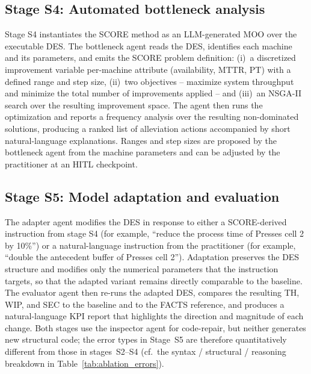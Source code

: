 \documentclass[a4paper,fleqn]{cas-sc}
\begin{document}
  \subsection{Stage S4: Automated bottleneck analysis}\label{sec:framework-s4}                                          
   
  Stage S4 instantiates the SCORE method \citep{Bernedixen2015} as an LLM-generated MOO over the executable DES. The    
  bottleneck agent reads the DES, identifies each machine and its parameters, and emits the SCORE problem definition:
  (i)~a discretized improvement variable per-machine attribute (availability, MTTR, PT) with a defined range and    
  step size, (ii)~two objectives -- maximize system throughput and minimize the total number of improvements applied --
  and (iii)~an NSGA-II search over the resulting improvement space. The agent then runs the optimization and reports a
  frequency analysis over the resulting non-dominated solutions, producing a ranked list of alleviation actions
  accompanied by short natural-language explanations. Ranges and step sizes are proposed by the bottleneck agent from
  the machine parameters and can be adjusted by the practitioner at an HITL checkpoint.

  \subsection{Stage S5: Model adaptation and evaluation}\label{sec:framework-s5}                                        
   
  The adapter agent modifies the DES in response to either a SCORE-derived instruction from stage S4 (for example,      
  ``reduce the process time of Presses cell 2 by 10\%'') or a natural-language instruction from the practitioner (for
  example, ``double the antecedent buffer of Presses cell 2''). Adaptation preserves the DES structure and modifies only
   the numerical parameters that the instruction targets, so that the adapted variant remains directly comparable to the
   baseline. The evaluator agent then re-runs the adapted DES, compares the resulting TH, WIP, and SEC to the baseline
  and to the FACTS reference, and produces a natural-language KPI report that highlights the direction and magnitude of
  each change. Both stages use the inspector agent for code-repair, but neither generates new structural code; the error types in Stage~S5 are therefore quantitatively different from those in stages~S2--S4 (cf.\ the syntax / structural / reasoning breakdown in Table~\ref{tab:ablation_errors}).
  
\end{document}
